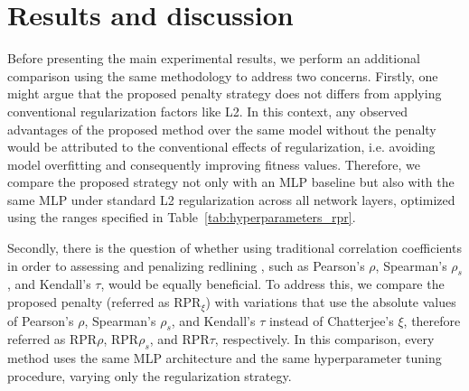 \section{Results and discussion}

Before presenting the main experimental results, we perform an additional comparison using the same methodology to address two concerns. Firstly, one might argue that the proposed penalty strategy does not differs from applying conventional regularization factors like L2. In this context, any observed advantages of the proposed method over the same model without the penalty would be attributed to the conventional effects of regularization, i.e. avoiding model overfitting and consequently improving fitness values. Therefore, we compare the proposed strategy not only with an MLP baseline but also with the same MLP under standard L2 regularization across all network layers, optimized using the ranges specified in Table~\ref{tab:hyperparameters_rpr}.

Secondly, there is the question of whether using traditional correlation coefficients in order to assessing and penalizing redlining , such as Pearson's $\rho$, Spearman's $\rho_s$, and Kendall's $\tau$, would be equally beneficial. To address this, we compare the proposed penalty (referred as RPR$_\xi$) with variations that use the absolute values of Pearson's $\rho$, Spearman's $\rho_s$, and Kendall's $\tau$ instead of Chatterjee's $\xi$, therefore referred as RPR$\rho$, RPR${\rho_s}$, and RPR$\tau$, respectively. In this comparison, every method uses the same MLP architecture and the same hyperparameter tuning procedure, varying only the regularization strategy.

